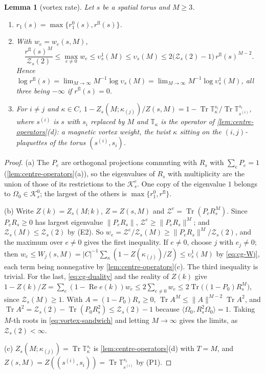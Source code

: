 \documentclass[11pt,a4paper]{amsart}
\newtheorem{lemma}[theorem]{Lemma}
\theoremstyle{definition}
\theoremstyle{remark}
\numberwithin{equation}{section}
\DeclareMathOperator{\Tr}{Tr}        %
\newcommand{\Kspace}{\mathcal{K}}    %
\newcommand{\ip}[2]{\langle #1,#2\rangle}  %
\newcommand{\norm}[1]{\lVert #1\rVert}     %
\newcommand{\abs}[1]{\lvert #1\rvert}      %
\newcommand{\TT}{\mathbb{T}}               %
\newcommand{\Zpart}[2]{Z(#1,#2)}           %
\newcommand{\Zc}{\mathcal{Z}}              %
\newcommand{\Zs}[2]{\Zc_{#1}(#2)}          %
\newcommand{\Omegazero}{\Omega_0}          %
\begin{document}
\begin{lemma}[vortex rate]\label{lem:vortex-rate}
Let $s$ be a spatial torus and $M\ge3$.
\begin{enumerate}[label=\textup{(\alph*)},leftmargin=*]
\item $r_1(s)=\max\{r_1^0(s),r^{\mathrm{fl}}(s)\}$.
\item With $w_e=w_e(s,M)$,
\begin{equation}\label{eq:vortex-sandwich}
\frac{r^{\mathrm{fl}}(s)^M}{\Zs{s}{2}}\le\max_{e\ne0}w_e\le\upsilon^1_s(M)\le\upsilon_s(M)\le2\bigl(\Zs{s}{2}-1\bigr)\,r^{\mathrm{fl}}(s)^{M-2}.
\end{equation}
Hence $\log r^{\mathrm{fl}}(s)=\lim_{M\to\infty}M^{-1}\log\upsilon_s(M)=\lim_{M\to\infty}M^{-1}\log\upsilon^1_s(M)$, all three being $-\infty$ if $r^{\mathrm{fl}}(s)=0$.
\item For $i\ne j$ and $\kappa\in C$, $1-Z_s(M;\kappa_{(j)})/\Zpart{s}{M}=1-\Tr\TT_\kappa^{s_i}/\Tr\TT_{s^{(i)}}^{s_i}$, where $s^{(i)}$ is $s$ with $s_i$ replaced by $M$ and $\TT_\kappa$ is the operator of \cref{lem:centre-operators}\textup{(d)}: a magnetic vortex weight, the twist $\kappa$ sitting on the $(i,j)$-plaquettes of the torus $(s^{(i)},s_i)$.
\end{enumerate}
\end{lemma}

\begin{proof}
(a) The $P_e$ are orthogonal projections commuting with $R_s$ with $\sum_eP_e=1$ (\cref{lem:centre-operators}\textup{(a)}), so the eigenvalues of $R_s$ with multiplicity are the union of those of its restrictions to the $\Kspace^e_s$. One copy of the eigenvalue $1$ belongs to $\Omegazero\in\Kspace^0_s$; the largest of the others is $\max\{r_1^0,r^{\mathrm{fl}}\}$.

(b) Write $Z(k)=Z_s(M;k)$, $Z=\Zpart{s}{M}$ and $\Zc^e=\Tr(P_eR_s^M)$. Since $P_eR_s\ge0$ has largest eigenvalue $\norm{P_eR_s}$, $\Zc^e\ge\norm{P_eR_s}^M$; and $\Zs{s}{M}\le\Zs{s}{2}$ by (E2). So $w_e=\Zc^e/\Zs{s}{M}\ge\norm{P_eR_s}^M/\Zs{s}{2}$, and the maximum over $e\ne0$ gives the first inequality. If $e\ne0$, choose $j$ with $e_j\ne0$; then $w_e\le W_j(s,M)=\abs{C}^{-1}\sum_\kappa(1-Z(\kappa_{(j)})/Z)\le\upsilon^1_s(M)$ by \eqref{eq:cg-Wj}, each term being nonnegative by \cref{lem:centre-operators}\textup{(c)}. The third inequality is trivial. For the last, \eqref{eq:cg-duality} and the reality of $Z(k)$ give $1-Z(k)/Z=\sum_e(1-\operatorname{Re}e(k))w_e\le2\sum_{e\ne0}w_e\le2\Tr\bigl((1-P_0)R_s^M\bigr)$, since $\Zs{s}{M}\ge1$. With $A=(1-P_0)R_s\ge0$, $\Tr A^M\le\norm{A}^{M-2}\Tr A^2$, and $\Tr A^2=\Zs{s}{2}-\Tr(P_0R_s^2)\le\Zs{s}{2}-1$ because $\ip{\Omegazero}{R_s^2\Omegazero}=1$. Taking $M$-th roots in \eqref{eq:vortex-sandwich} and letting $M\to\infty$ gives the limits, as $\Zs{s}{2}<\infty$.

(c) $Z_s(M;\kappa_{(j)})=\Tr\TT_\kappa^{s_i}$ is \cref{lem:centre-operators}\textup{(d)} with $T=M$, and $\Zpart{s}{M}=Z((s^{(i)},s_i))=\Tr\TT_{s^{(i)}}^{s_i}$ by (P1).
\end{proof}
\end{document}
